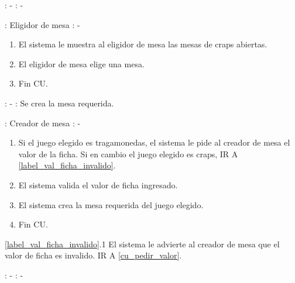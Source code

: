 : - \newline
\indent{}: -

: Eligidor de mesa \newline
\indent{}: -

\begin{enumerate}
\item El sistema le muestra al eligidor de mesa las mesas de craps abiertas.
\item El eligidor de mesa elige una mesa.
\item Fin CU.
\end{enumerate}



: - \newline
\indent{}: Se crea la mesa requerida.

: Creador de mesa \newline
\indent{}: -

\begin{enumerate}
\item Si el juego elegido es tragamonedas, el sistema le pide al creador de mesa el valor de la ficha. Si en cambio el juego elegido es craps, IR A \ref{label_val_ficha_invalido}. \label{cu_pedir_valor}
\item El sistema valida el valor de ficha ingresado.
\item El sistema crea la mesa requerida del juego elegido. \label{label_val_ficha_invalido}
\item Fin CU.
\end{enumerate}


\ref{label_val_ficha_invalido}.1 El sistema le advierte al creador de mesa que el valor de ficha es invalido. IR A \ref{cu_pedir_valor}.





: - \newline
\indent{}: -

